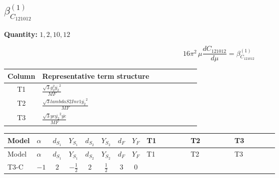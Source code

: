 \documentclass[8pt]{article}
\begin{document}
\begin{landscape}
\section*{$\beta_{C_{121012}}^{(1)}$}
\noindent\textbf{Quantity: }$\mathrm{1,2,10,12}$\par\smallskip
\[16\pi^2\,\mu\frac{d C_{121012}}{d\mu}=\beta_{C_{121012}}^{(1)}\]
\begin{center}
\begin{tabular}{@{}c >{\raggedright\arraybackslash}p{0.82\linewidth}@{}}
\toprule
Column & Representative term structure \\
\midrule
T1 & \(\displaystyle \frac{\sqrt{3} g_{2}^{2} \overline{y_{2}}^{2}}{MF}\) \\
\midrule
T2 & \(\displaystyle \frac{\sqrt{3} lambdaS2Inv1 \overline{y_{2}}^{2}}{MF}\) \\
\midrule
T3 & \(\displaystyle \frac{\sqrt{3} ye \overline{y_{2}}^{2} \overline{ye}}{MF}\) \\
\midrule
\bottomrule
\end{tabular}
\end{center}
\smallskip
\tiny
\begin{longtable}{@{}llcccccc >{\raggedright\arraybackslash}p{0.21\linewidth} >{\raggedright\arraybackslash}p{0.21\linewidth} >{\raggedright\arraybackslash}p{0.21\linewidth}@{}}
\toprule
Model & $\alpha$ & $d_{S_1}$ & $Y_{S_1}$ & $d_{S_2}$ & $Y_{S_2}$ & $d_F$ & $Y_F$ & T1 & T2 & T3 \\
\midrule
\endfirsthead
\toprule
Model & $\alpha$ & $d_{S_1}$ & $Y_{S_1}$ & $d_{S_2}$ & $Y_{S_2}$ & $d_F$ & $Y_F$ & T1 & T2 & T3 \\
\midrule
\endhead
T3-C & $-1$ & $2$ & $-\frac{1}{2}$ & $2$ & $\frac{1}{2}$ & $3$ & $0$ & \scriptsize\adjustbox{max width=\linewidth}{$\begin{gathered} - \frac{\sqrt{3} g_{2}^{2} \overline{y_{2}}^{2}}{8 MF}\end{gathered}$} & \scriptsize\adjustbox{max width=\linewidth}{$\begin{gathered} - \frac{\sqrt{3} lambdaS2Inv1 \overline{y_{2}}^{2}}{12 MF}\end{gathered}$} & \scriptsize\adjustbox{max width=\linewidth}{$\begin{gathered} \frac{\sqrt{3} ye \overline{y_{2}}^{2} \overline{ye}}{24 MF}\end{gathered}$} \\
\midrule
\bottomrule
\end{longtable}
\clearpage

\end{landscape}
\end{document}

